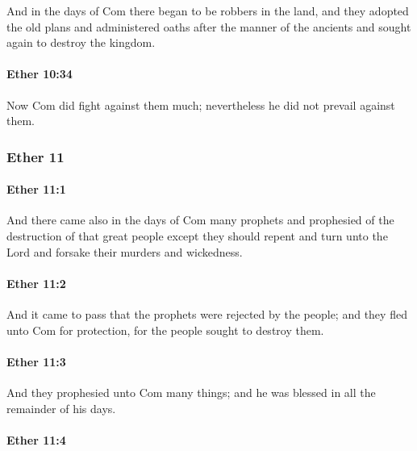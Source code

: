 			And in the days of Com there began to be robbers in the land,
			and they adopted the old plans
			and administered oaths after the manner of the ancients
			and sought again to destroy the kingdom.

		\paragraph{Ether 10:34} %
			\label{ETHER-10-34}

			Now Com did fight against them much;
			nevertheless he did not prevail against them.

	\subsubsection{Ether 11} %
		\label{ETHER-11}
		
		\paragraph{Ether 11:1} %
			\label{ETHER-11-1}

			And there came also in the days of Com many prophets
			and prophesied of the destruction of that great people
			except they should repent and turn unto the Lord
			and forsake their murders and wickedness.

		\paragraph{Ether 11:2} %
			\label{ETHER-11-2}

			And it came to pass that the prophets were rejected by the people;
			and they fled unto Com for protection,
			for the people sought to destroy them.

		\paragraph{Ether 11:3} %
			\label{ETHER-11-3}

			And they prophesied unto Com many things;
			and he was blessed in all the remainder of his days.

		\paragraph{Ether 11:4} %
			\label{ETHER-11-4}


